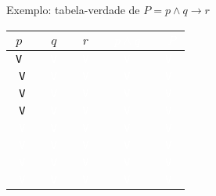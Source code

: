 \begin{frame}[fragile]{Exemplo: tabela-verdade de $P = p \land q \to r$}

    \begin{table}
        \centering
        \begin{tabular}{>{\tt}c>{\tt}c>{\tt}c>{\tt}c>{\tt}c}
            \hline
            $p$ & $q$ & $r$ & \textcolor{white}{$p\land q$} & \textcolor{white}{$P$}\\
            \hline
            \textcolor{black}{V} & \textcolor{white}{V} & \textcolor{white}{V} & \textcolor{white}{V} & \textcolor{white}{V} \\
            \hline
            \textcolor{black}{V} & \textcolor{white}{V} & \textcolor{white}{V} & \textcolor{white}{V} & \textcolor{white}{V} \\
            \hline
            \textcolor{black}{V} & \textcolor{white}{V} & \textcolor{white}{V} & \textcolor{white}{V} & \textcolor{white}{V} \\
            \hline
            \textcolor{black}{V} & \textcolor{white}{V} & \textcolor{white}{V} & \textcolor{white}{V} & \textcolor{white}{V} \\
            \hline
            \textcolor{white}{V} & \textcolor{white}{V} & \textcolor{white}{V} & \textcolor{white}{V} & \textcolor{white}{V} \\
            \hline
            \textcolor{white}{V} & \textcolor{white}{V} & \textcolor{white}{V} & \textcolor{white}{V} & \textcolor{white}{V} \\
            \hline
            \textcolor{white}{V} & \textcolor{white}{V} & \textcolor{white}{V} & \textcolor{white}{V} & \textcolor{white}{V} \\
            \hline
            \textcolor{white}{V} & \textcolor{white}{V} & \textcolor{white}{V} & \textcolor{white}{V} & \textcolor{white}{V} \\
            \hline
        \end{tabular}
    \end{table}
\end{frame}

